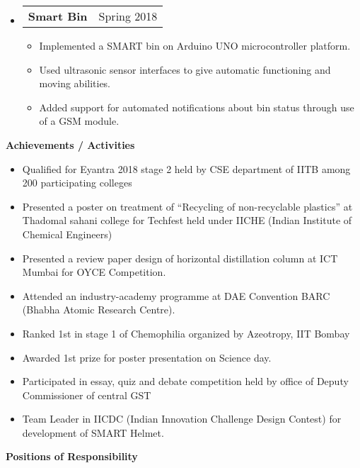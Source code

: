\documentclass[letterpaper,12pt]{article}[leftmargin=*]
\makeatletter
\def \entryspacing {-0pt}
\renewcommand{\section}[2]{\vspace{5pt}
  \colorbox{secondary}{\color{white}\raggedbottom\normalsize\textbf{{#1}{\hspace{7pt}#2}}}
}
\newcommand{\resumeEntryStart}{\begin{itemize}[leftmargin=2.5mm]}
\newcommand{\resumeEntryEnd}{\end{itemize}\vspace{\entryspacing}}
\newcommand{\resumeItemListStart}{\begin{itemize}[leftmargin=4.5mm]}
\newcommand{\resumeItemListEnd}{\end{itemize}}
\newcommand{\resumeItem}[1]{
  \item\small{
    {#1 \vspace{-2pt}}
  }
}
\newcommand{\resumeEntryTD}[2]{
  \vspace{-1pt}\item[]
    \begin{tabular*}{0.97\textwidth}{l@{\extracolsep{\fill}}r}
      \textbf{\color{primary}#1} & {\firabook\color{accent}\small#2} \\
    \end{tabular*}\vspace{-6pt}
}
\makeatother
\begin{document}
\resumeEntryStart
      \resumeEntryTD
      {Smart Bin}{Spring 2018}
    \resumeItemListStart
      \resumeItem {Implemented a SMART bin on Arduino UNO microcontroller platform.}
      \resumeItem {Used ultrasonic sensor interfaces to give automatic functioning and moving abilities.}
      \resumeItem {Added support for automated notifications about bin status through use of a GSM module.}
    \resumeItemListEnd
  \resumeEntryEnd

  

\section{\faFlag}{Achievements / Activities}
\resumeEntryStart
  \resumeItem {Qualified for Eyantra 2018 stage 2 held by CSE department of IITB among 200 participating colleges}
  \vspace{-4pt}

  \resumeItem {Presented a poster on treatment of “Recycling of non-recyclable plastics” at Thadomal sahani college for Techfest held under IICHE (Indian Institute of Chemical Engineers)}
  \vspace{-4pt}

  \resumeItem {Presented a review paper design of  horizontal distillation column at ICT Mumbai for OYCE Competition. }
  \vspace{-4pt}

  \resumeItem {Attended an industry-academy programme at DAE Convention BARC (Bhabha Atomic Research Centre).}
  \vspace{-4pt}

  \resumeItem {Ranked 1st in stage 1 of Chemophilia organized by Azeotropy, IIT Bombay}
  \vspace{-4pt}

  \resumeItem {Awarded 1st prize for poster presentation on Science day.}
  \vspace{-4pt}

  \resumeItem {Participated in essay, quiz and debate competition held by office of Deputy Commissioner of central GST}
  \vspace{-4pt}

  \resumeItem {Team Leader in IICDC (Indian Innovation Challenge Design Contest) for development of SMART Helmet.}
  \vspace{-4pt}
 
  \resumeEntryEnd
  
  
\section{\faPieChart}{Positions of Responsibility}
  \vspace{3pt}
 
\end{document}
